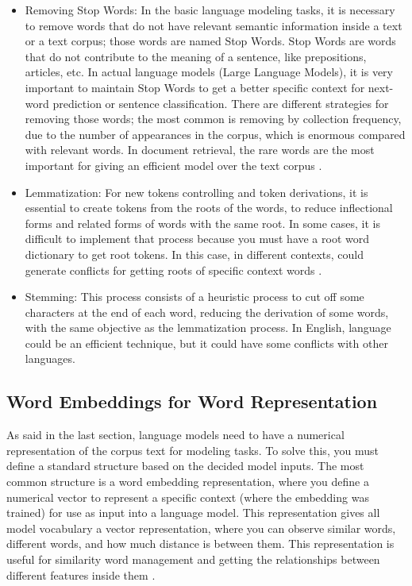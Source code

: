 \begin{itemize}
    \item Removing Stop Words: In the basic language modeling tasks, it is necessary to remove words that do not have relevant semantic information inside a text or a text corpus; those words are named Stop Words. Stop Words are words that do not contribute to the meaning of a sentence, like prepositions, articles, etc. In actual language models (Large Language Models), it is very important to maintain Stop Words to get a better specific context for next-word prediction or sentence classification. There are different strategies for removing those words; the most common is removing by collection frequency, due to the number of appearances in the corpus, which is enormous compared with relevant words. In document retrieval, the rare words are the most important for giving an efficient model over the text corpus \citet{information-retrieval}. 
    \item Lemmatization: For new tokens controlling and token derivations, it is essential to create tokens from the roots of the words, to reduce inflectional forms and related forms of words with the same root. In some cases, it is difficult to implement that process because you must have a root word dictionary to get root tokens. In this case, in different contexts, could generate conflicts for getting roots of specific context words \cite{information-retrieval}.
    \item Stemming: This process consists of a heuristic process to cut off some characters at the end of each word, reducing the derivation of some words, with the same objective as the lemmatization process. In English, language could be an efficient technique, but it could have some conflicts with other languages.
\end{itemize}


\subsection{Word Embeddings for Word Representation}
As said in the last section, language models need to have a numerical representation of the corpus text for modeling tasks. To solve this, you must define a standard structure based on the decided model inputs. The most common structure is a word embedding representation, where you define a numerical vector to represent a specific context (where the embedding was trained) for use as input into a language model. This representation gives all model vocabulary a vector representation, where you can observe similar words, different words, and how much distance is between them. This representation is useful for similarity word management and getting the relationships between different features inside them \citet{nlp-fundamentals}. 


